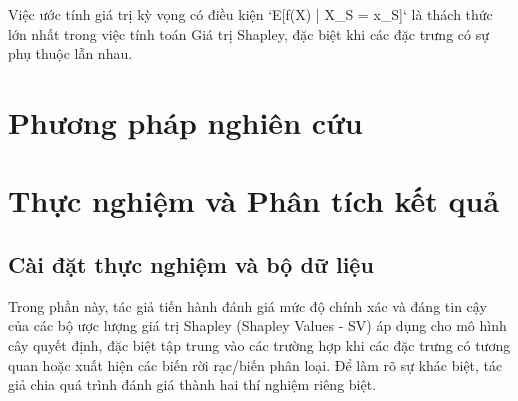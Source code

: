 \documentclass[12pt, a4paper]{article}
\begin{document}
Việc ước tính giá trị kỳ vọng có điều kiện `E[f(X) | X_S = x_S]` là thách thức lớn nhất trong việc tính toán Giá trị Shapley, đặc biệt khi các đặc trưng có sự phụ thuộc lẫn nhau.


\section{Phương pháp nghiên cứu}

\section{Thực nghiệm và Phân tích kết quả}
\subsection{Cài đặt thực nghiệm và bộ dữ liệu}

Trong phần này, tác giả tiến hành đánh giá mức độ chính xác và đáng tin cậy của các bộ ược lượng giá trị Shapley (Shapley Values - SV) áp dụng cho mô hình cây quyết định, đặc biệt tập trung vào các trường hợp khi các đặc trưng có tương quan hoặc xuất hiện các biến rời rạc/biến phân loại. Để làm rõ sự khác biệt, tác giả chia quá trình đánh giá thành hai thí nghiệm riêng biệt.
\end{document}
